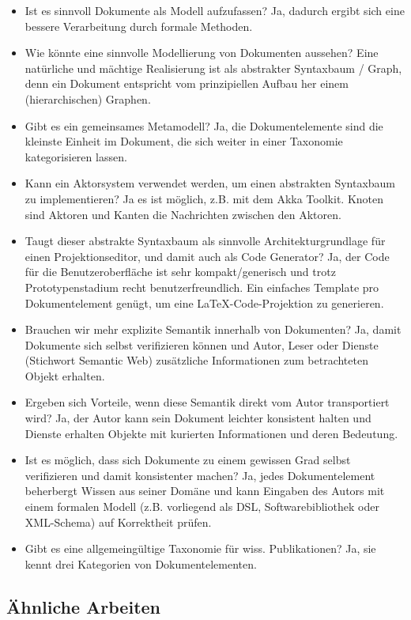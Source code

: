  
\begin{itemize}

\item Ist es sinnvoll Dokumente als Modell aufzufassen? Ja, dadurch ergibt sich eine bessere Verarbeitung durch formale Methoden.
\item Wie könnte eine sinnvolle Modellierung von Dokumenten aussehen? Eine natürliche und mächtige Realisierung ist als abstrakter Syntaxbaum / Graph, denn ein Dokument entspricht vom prinzipiellen Aufbau her einem (hierarchischen) Graphen.
\item Gibt es ein gemeinsames Metamodell? Ja, die Dokumentelemente sind die kleinste Einheit im Dokument, die sich weiter in einer Taxonomie kategorisieren lassen.
\item Kann ein Aktorsystem verwendet werden, um einen abstrakten Syntaxbaum zu implementieren? Ja es ist möglich, z.B. mit dem Akka Toolkit. Knoten sind Aktoren und Kanten die Nachrichten zwischen den Aktoren.
\item Taugt dieser abstrakte Syntaxbaum als sinnvolle Architekturgrundlage für einen Projektionseditor, und damit auch als Code Generator? Ja, der Code für die Benutzeroberfläche ist sehr kompakt/generisch und trotz Prototypenstadium recht benutzerfreundlich. Ein einfaches Template pro Dokumentelement genügt, um eine LaTeX-Code-Projektion zu generieren.
\item Brauchen wir mehr explizite Semantik innerhalb von Dokumenten? Ja, damit Dokumente sich selbst verifizieren können und Autor, Leser oder Dienste (Stichwort Semantic Web) zusätzliche Informationen zum betrachteten Objekt erhalten.
\item Ergeben sich Vorteile, wenn diese Semantik direkt vom Autor transportiert wird? Ja, der Autor kann sein Dokument leichter konsistent halten und Dienste erhalten Objekte mit kurierten Informationen und deren Bedeutung.
\item Ist es möglich, dass sich Dokumente zu einem gewissen Grad selbst verifizieren und damit konsistenter machen? Ja, jedes Dokumentelement beherbergt Wissen aus seiner Domäne und kann Eingaben des Autors mit einem formalen Modell (z.B. vorliegend als DSL, Softwarebibliothek oder XML-Schema) auf Korrektheit prüfen.
\item Gibt es eine allgemeingültige Taxonomie für wiss. Publikationen? Ja, sie kennt drei Kategorien von Dokumentelementen.
\end{itemize}
 
\subsection{Ähnliche Arbeiten}\label{}
 
